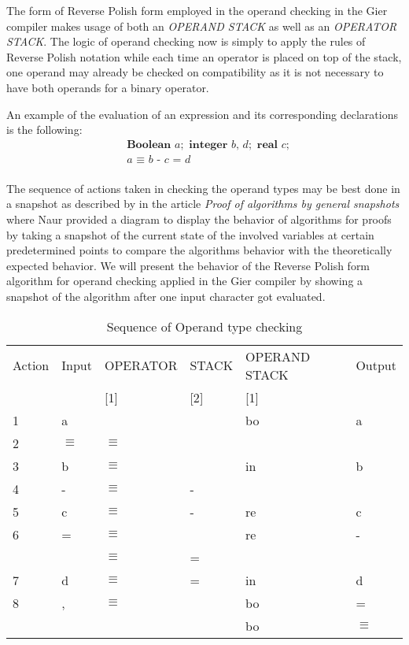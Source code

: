 \documentclass{article}
\begin{document}
The form of Reverse Polish form employed in the operand checking in the Gier compiler makes usage of both an \textit{OPERAND STACK} as well as an \textit{OPERATOR STACK}. The logic of operand checking now is simply to apply the rules of Reverse Polish notation while each time an operator is placed on top of the stack, one operand may already be checked on compatibility as it is not necessary to have both operands for a binary operator.

An example of the evaluation of an expression and its corresponding declarations is the following:
\begin{equation} \label{eq7}
	\begin{split}
		&\textbf{Boolean} \textit{ a}; \textbf{ integer } \textit{b, d}; \textbf{ real } \textit{c};\\
		&\textit{a } \equiv \textit{ b - c = d}\\
	\end{split}
\end{equation}

The sequence of actions taken in checking the operand types may be best done in a snapshot as described by \cite{naur1966proof} in the article \textit{Proof of algorithms by general snapshots} where Naur provided a diagram to display the behavior of algorithms for proofs by taking a snapshot of the current state of the involved variables at certain predetermined points to compare the algorithms behavior with the theoretically expected behavior. We will present the behavior of the Reverse Polish form algorithm for operand checking applied in the Gier compiler by showing a snapshot of the algorithm after one input character got evaluated.
\\
\begin{table}[H]
	\centering
	\begin{tabular}{llllll}
		Action & Input & OPERATOR & STACK & OPERAND STACK & Output \\
		&  & {[}1{]} & {[}2{]} & {[}1{]} &  \\
		1 & a &  &  & bo & a \\
		2 & $\equiv$ & $\equiv$ &  &  &  \\
		3 & b & $\equiv$ &  & in & b \\
		4 & - & $\equiv$ & - &  &  \\
		5 & c & $\equiv$ & - & re & c \\
		6 & = & $\equiv$ &  & re & - \\
		&  &$\equiv$ & = &  &  \\
		7 & d & $\equiv$ & = & in & d \\
		8 & , & $\equiv$ &  & bo & = \\
		&  &  &  & bo & $\equiv$
	\end{tabular}
	\caption{Sequence of Operand type checking}
	\label{tab:my-table}
\end{table}
\end{document}
